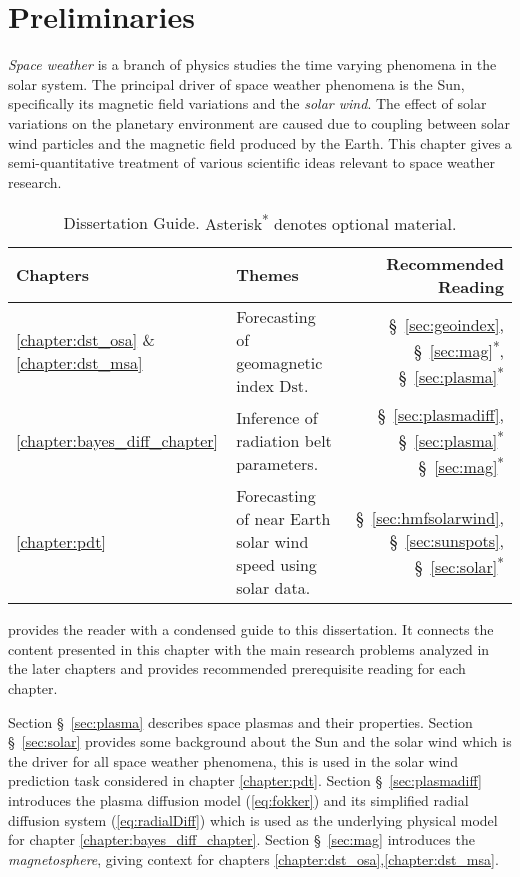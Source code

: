 \chapter{Preliminaries}\label{chapter:preliminaries}

\emph{Space weather} is a branch of physics studies the time varying phenomena in the solar system. The principal 
driver of space weather phenomena is the Sun, specifically its magnetic field variations and the \emph{solar wind}.
The effect of solar variations on the planetary environment are caused due to coupling between solar wind particles 
and the magnetic field produced by the Earth. This chapter gives a semi-quantitative treatment of 
various scientific ideas relevant to space weather research.

\begin{table}
    \centering
    \begin{tabular}{l p{} r}
        \hline
        \textbf{Chapters} & \textbf{Themes} & \textbf{Recommended Reading}\\
        \hline
        \vspace{5pt}
        \ref{chapter:dst_osa} \& \ref{chapter:dst_msa} & Forecasting of geomagnetic index $\mathrm{Dst}$. & \S~\ref{sec:geoindex}, \S~\ref{sec:mag}\textsuperscript{*}, \S~\ref{sec:plasma}\textsuperscript{*} \\
        \ref{chapter:bayes_diff_chapter} & Inference of radiation belt parameters. & \S~\ref{sec:plasmadiff}, \S~\ref{sec:plasma}\textsuperscript{*} \S~\ref{sec:mag}\textsuperscript{*} \\
        \ref{chapter:pdt} & Forecasting of near Earth solar wind speed using solar data. & \S~\ref{sec:hmfsolarwind}, \S~\ref{sec:sunspots}, \S~\ref{sec:solar}\textsuperscript{*}\\
        \hline
    \end{tabular}
    \caption{Dissertation Guide. {\small Asterisk\textsuperscript{*} denotes optional material.}}
    \label{table:chapterguide}
\end{table}

 provides the reader with a condensed guide to this dissertation. 
It connects the content presented in this chapter with the main research problems analyzed in the later chapters 
and provides recommended prerequisite reading for each chapter.

Section \S~\ref{sec:plasma} describes space plasmas and their properties. Section \S~\ref{sec:solar} provides some 
background about the Sun and the solar wind which is the driver for all space weather phenomena, this is used in the 
solar wind prediction task considered in chapter \ref{chapter:pdt}. Section \S~\ref{sec:plasmadiff} introduces the 
plasma diffusion model (\cref{eq:fokker}) and its simplified radial diffusion system (\cref{eq:radialDiff}) which is 
used as the underlying physical model for chapter \ref{chapter:bayes_diff_chapter}. Section \S~\ref{sec:mag} introduces 
the \emph{magnetosphere}, giving context for chapters \ref{chapter:dst_osa},\ref{chapter:dst_msa}. 


